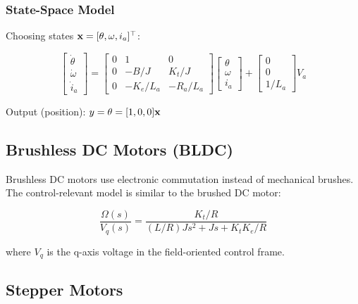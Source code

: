 \subsubsection{State-Space Model}

Choosing states $\mathbf{x} = [\theta, \omega, i_a]^\top$:

\begin{equation}
\begin{bmatrix} \dot{\theta} \\ \dot{\omega} \\ \dot{i}_a \end{bmatrix} =
\begin{bmatrix}
0 & 1 & 0 \\
0 & -B/J & K_t/J \\
0 & -K_e/L_a & -R_a/L_a
\end{bmatrix}
\begin{bmatrix} \theta \\ \omega \\ i_a \end{bmatrix} +
\begin{bmatrix} 0 \\ 0 \\ 1/L_a \end{bmatrix} V_a
\end{equation}

Output (position): $y = \theta = [1, 0, 0]\mathbf{x}$

\subsection{Brushless DC Motors (BLDC)}
\label{subsec:bldc}

Brushless DC motors use electronic commutation instead of mechanical brushes. The control-relevant model is similar to the brushed DC motor:

\begin{equation}
\frac{\Omega(s)}{V_q(s)} = \frac{K_t/R}{(L/R)Js^2 + Js + K_t K_e/R}
\end{equation}

where $V_q$ is the q-axis voltage in the field-oriented control frame.

\subsection{Stepper Motors}
\label{subsec:stepper}


